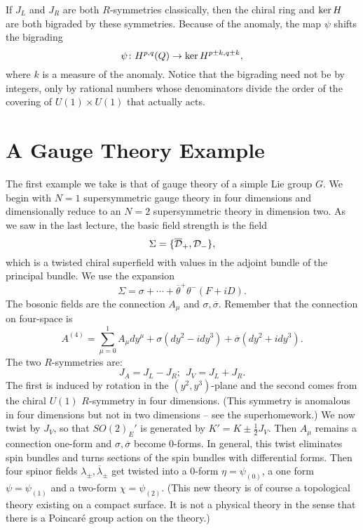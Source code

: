 If $J_L$ and $J_R$ are both $R$-symmetries classically, then the
chiral ring and ${\rm ker}\,H$ are both bigraded by these
symmetries. Because of the anomaly, the map $\psi$ shifts the
bigrading
$$\psi\colon H^{p,q}(Q)\to {\rm ker}\,H^{p\pm k,q\pm k},$$
where $k$ is a measure of the anomaly.
Notice that the bigrading need not be by integers, only by rational
numbers whose denominators divide the order of the covering of
$U(1)\times U(1)$ that actually acts.


\section{A Gauge Theory Example}

The first example we take is that of gauge theory of a simple Lie
group $G$. We begin with $N=1$ supersymmetric gauge theory in four
dimensions and dimensionally reduce to an $N=2$ supersymmetric theory
in dimension two. As we saw in the last lecture, the basic field
strength is the field 
$$\Sigma=\{\overline{\cal D}_+,{\cal D}_-\},$$
which is a twisted chiral superfield with values in the adjoint bundle
of the principal bundle.
We use the expansion
$$\Sigma=\sigma+\cdots+\overline\theta^+\theta^-(F+iD).$$
The bosonic fields are the connection $A_\mu$ and  $\sigma,\overline
\sigma$.
Remember that the connection on four-space is
$$A^{(4)}=\sum_{\mu=0}^1A_\mu dy^\mu
+\sigma(dy^2-idy^3)+\overline\sigma(dy^2+idy^3).$$    
The two $R$-symmetries are:
$$J_A=J_L-J_R;\ \ J_V=J_L+J_R.$$
The first is induced by rotation in the $(y^2,y^3)$-plane and the second
comes from the chiral $U(1)$ $R$-symmetry in four dimensions.
(This symmetry is anomalous in four  dimensions but not in two
dimensions -- see the superhomework.)
We now twist by $J_V$, so that $SO(2)_E'$ is generated by $K'=K\pm
\frac{1}{2}J_V$.  Then $A_\mu$ remains a connection one-form and
$\sigma,\overline\sigma$ become $0$-forms. In general, this twist
eliminates spin bundles and turns  sections of the spin bundles with
differential forms. Then four spinor fields
$\lambda_\pm,\overline\lambda_\pm$ get twisted into
a $0$-form
$\eta=\psi_{(0)}$, a one form $\psi=\psi_{(1)}$ and a two-form
$\chi=\psi_{(2)}$. 
(This new theory is of course a topological theory existing on a
compact surface.  It is not a physical theory in the sense that there
is a Poincar\'e group action on the theory.)


